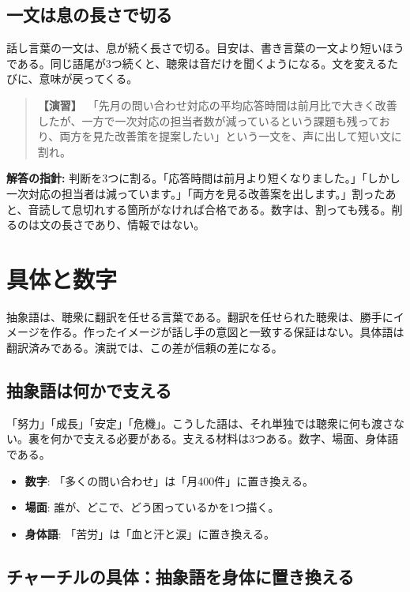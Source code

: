 \documentclass{article}
\begin{document}
\subsection{一文は息の長さで切る}

話し言葉の一文は、息が続く長さで切る。目安は、書き言葉の一文より短いほうである。同じ語尾が3つ続くと、聴衆は音だけを聞くようになる。文を変えるたびに、意味が戻ってくる。

\begin{quote}
\textbf{【演習】}\ 「先月の問い合わせ対応の平均応答時間は前月比で大きく改善したが、一方で一次対応の担当者数が減っているという課題も残っており、両方を見た改善策を提案したい」という一文を、声に出して短い文に割れ。
\end{quote}

\textbf{解答の指針:} 判断を3つに割る。「応答時間は前月より短くなりました。」「しかし一次対応の担当者は減っています。」「両方を見る改善案を出します。」割ったあと、音読して息切れする箇所がなければ合格である。数字は、割っても残る。削るのは文の長さであり、情報ではない。

\section{具体と数字}

抽象語は、聴衆に翻訳を任せる言葉である。翻訳を任せられた聴衆は、勝手にイメージを作る。作ったイメージが話し手の意図と一致する保証はない。具体語は翻訳済みである。演説では、この差が信頼の差になる。

\subsection{抽象語は何かで支える}

「努力」「成長」「安定」「危機」。こうした語は、それ単独では聴衆に何も渡さない。裏を何かで支える必要がある。支える材料は3つある。数字、場面、身体語である。

\begin{itemize}
\item \textbf{数字}: 「多くの問い合わせ」は「月400件」に置き換える。
\item \textbf{場面}: 誰が、どこで、どう困っているかを1つ描く。
\item \textbf{身体語}: 「苦労」は「血と汗と涙」に置き換える。
\end{itemize}

\subsection{チャーチルの具体：抽象語を身体に置き換える}
\end{document}
